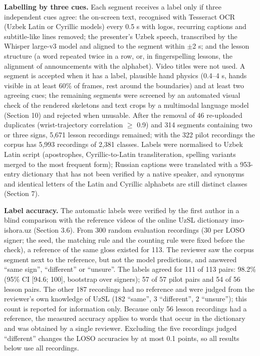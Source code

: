 \documentclass[a4paper,fleqn]{cas-dc}
\begin{document}
\textbf{Labelling by three cues.} Each segment receives a label only if three independent cues agree: the on-screen text, recognised with Tesseract OCR \cite{2007_smith_tesseract} (Uzbek Latin or Cyrillic models) every 0.5 s with logos, recurring captions and subtitle-like lines removed; the presenter's Uzbek speech, transcribed by the Whisper large-v3 model \cite{2023_radford_whisper} and aligned to the segment within $\pm$2 s; and the lesson structure (a word repeated twice in a row, or, in fingerspelling lessons, the alignment of announcements with the alphabet). Video titles were not used. A segment is accepted when it has a label, plausible hand physics (0.4--4 s, hands visible in at least 60\% of frames, rest around the boundaries) and at least two agreeing cues; the remaining segments were screened by an automated visual check of the rendered skeletons and text crops by a multimodal language model (Section 10) and rejected when unusable. After the removal of 46 re-uploaded duplicates (wrist-trajectory correlation $\geq$ 0.9) and 314 segments containing two or three signs, 5,671 lesson recordings remained; with the 322 pilot recordings the corpus has 5,993 recordings of 2,381 classes. Labels were normalised to Uzbek Latin script (apostrophes, Cyrillic-to-Latin transliteration, spelling variants merged to the most frequent form); Russian captions were translated with a 953-entry dictionary that has not been verified by a native speaker, and synonyms and identical letters of the Latin and Cyrillic alphabets are still distinct classes (Section 7).

\textbf{Label accuracy.} The automatic labels were verified by the first author in a blind comparison with the reference videos of the online UzSL dictionary imo-ishora.uz (Section 3.6). From 300 random evaluation recordings (30 per LOSO signer; the seed, the matching rule and the counting rule were fixed before the check), a reference of the same gloss existed for 113. The reviewer saw the corpus segment next to the reference, but not the model predictions, and answered ``same sign'', ``different'' or ``unsure''. The labels agreed for 111 of 113 pairs: 98.2\% (95\% CI {[}94.6; 100{]}, bootstrap over signers); 57 of 57 pilot pairs and 54 of 56 lesson pairs. The other 187 recordings had no reference and were judged from the reviewer's own knowledge of UzSL (182 ``same'', 3 ``different'', 2 ``unsure''); this count is reported for information only. Because only 56 lesson recordings had a reference, the measured accuracy applies to words that occur in the dictionary and was obtained by a single reviewer. Excluding the five recordings judged ``different'' changes the LOSO accuracies by at most 0.1 points, so all results below use all recordings.
\end{document}
